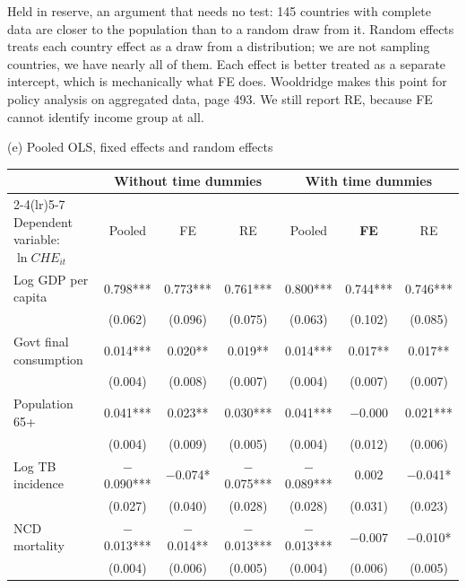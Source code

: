 \documentclass[10pt,aspectratio=169,t]{beamer}
\renewcommand{\arraystretch}{1.12}
\begin{document}
{Held in reserve, an argument that needs no test: 145 countries with complete
data are closer to the population than to a random draw from it. Random effects
treats each country effect as a draw from a distribution; we are not sampling
countries, we have nearly all of them. Each effect is better treated as a
separate intercept, which is mechanically what FE does. Wooldridge makes this
point for policy analysis on aggregated data, page 493. We still report RE,
because FE cannot identify income group at all.
}

\begin{frame}{(e) Pooled OLS, fixed effects and random effects}
\vspace{0.2em}
\begin{center}
\scriptsize
\setlength{\tabcolsep}{4.6pt}
\renewcommand{\arraystretch}{0.88}
\begin{tabular}{@{}l cccccc@{}}
\toprule
& \multicolumn{3}{c}{\textbf{Without time dummies}} & \multicolumn{3}{c}{\textbf{With time dummies}} \\
\cmidrule(lr){2-4}\cmidrule(lr){5-7}
Dependent variable: $\ln \mathit{CHE}_{it}$ & Pooled & FE & RE & Pooled & \textbf{FE} & RE \\
\midrule
Log GDP per capita      & 0.798*** & 0.773*** & 0.761*** & 0.800*** & \alert{0.744***} & 0.746*** \\
                        & (0.062) & (0.096) & (0.075) & (0.063) & \alert{(0.102)} & (0.085) \\
Govt final consumption  & 0.014*** & 0.020** & 0.019** & 0.014*** & 0.017** & 0.017** \\
                        & (0.004) & (0.008) & (0.007) & (0.004) & (0.007) & (0.007) \\
Population 65+          & 0.041*** & 0.023** & 0.030*** & 0.041*** & $-$0.000 & 0.021*** \\
                        & (0.004) & (0.009) & (0.005) & (0.004) & (0.012) & (0.006) \\
Log TB incidence        & $-$0.090*** & $-$0.074* & $-$0.075*** & $-$0.089*** & 0.002 & $-$0.041* \\
                        & (0.027) & (0.040) & (0.028) & (0.028) & (0.031) & (0.023) \\
NCD mortality           & $-$0.013*** & $-$0.014** & $-$0.013*** & $-$0.013*** & $-$0.007 & $-$0.010* \\
                        & (0.004) & (0.006) & (0.005) & (0.004) & (0.006) & (0.005) \\

\end{tabular}
\end{center}
\end{frame}
\end{document}
